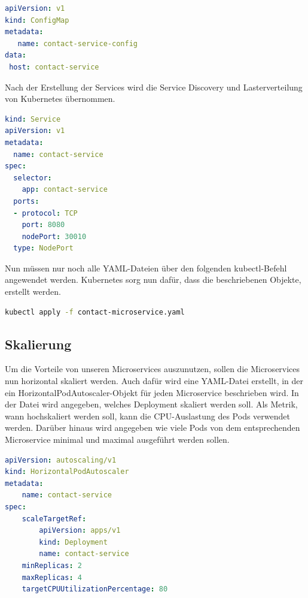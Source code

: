 \begin{lstlisting}[language=YAML, morekeywords=host, caption=Befehl , captionpos=b]
apiVersion: v1
kind: ConfigMap
metadata:
   name: contact-service-config
data:
 host: contact-service
\end{lstlisting}

Nach der Erstellung der Services wird die Service Discovery und Lasterverteilung von Kubernetes übernommen. 

\begin{lstlisting}[language=YAML, caption=Befehl , captionpos=b]
kind: Service
apiVersion: v1
metadata:
  name: contact-service
spec:
  selector:
    app: contact-service
  ports:
  - protocol: TCP
    port: 8080
    nodePort: 30010
  type: NodePort
\end{lstlisting}

Nun müssen nur noch alle YAML-Dateien über den folgenden kubectl-Befehl angewendet werden. Kubernetes sorg nun dafür, dass die beschriebenen Objekte, erstellt werden.

\begin{lstlisting}[language=bash, caption=Befehl , captionpos=b]
kubectl apply -f contact-microservice.yaml
\end{lstlisting}

\subsection{Skalierung}

Um die Vorteile von unseren Microservices auszunutzen, sollen die Microservices nun horizontal skaliert werden. Auch dafür wird eine YAML-Datei erstellt, in der ein HorizontalPodAutoscaler-Objekt für jeden Microservice beschrieben wird. In der Datei wird angegeben, welches Deployment skaliert werden soll. Als Metrik, wann hochskaliert werden soll, kann die CPU-Auslastung des Pods verwendet werden. Darüber hinaus wird angegeben wie viele Pods von dem entsprechenden Microservice minimal und maximal ausgeführt werden sollen.

\begin{lstlisting}[language=YAML, caption=Befehl , captionpos=b]
apiVersion: autoscaling/v1
kind: HorizontalPodAutoscaler
metadata:
    name: contact-service
spec:
    scaleTargetRef:
        apiVersion: apps/v1
        kind: Deployment
        name: contact-service
    minReplicas: 2
    maxReplicas: 4
    targetCPUUtilizationPercentage: 80
\end{lstlisting}
